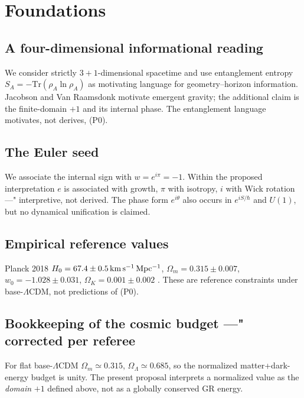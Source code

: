\documentclass[twocolumn]{aastex631}
\begin{document}
\section{Foundations}

\subsection{A four-dimensional informational reading}

We consider strictly $3+1$-dimensional spacetime and use entanglement entropy $S_{A}=-\mathrm{Tr}(\rho_{A}\ln\rho_{A})$ as motivating language for geometry--horizon information. Jacobson and Van Raamsdonk \cite{Jacobson2016,VanRaamsdonk2010} motivate emergent gravity; the additional claim is the finite-domain $+1$ and its internal phase. The entanglement language motivates, not derives, (P0).

\subsection{The Euler seed}

We associate the internal sign with $w=e^{i\pi}=-1$. Within the proposed interpretation $e$ is associated with growth, $\pi$ with isotropy, $i$ with Wick rotation ---" interpretive, not derived. The phase form $e^{i\theta}$ also occurs in $e^{iS/\hbar}$ and $U(1)$, but no dynamical unification is claimed.

\subsection{Empirical reference values}

Planck 2018 $H_{0}=67.4\pm0.5\,{\rm km\,s^{-1}\,Mpc^{-1}}$, $\Omega_{m}=0.315\pm0.007$, $w_{0}=-1.028\pm0.031$, $\Omega_{K}=0.001\pm0.002$ \cite{Planck2020}. These are reference constraints under base-$\Lambda$CDM, not predictions of (P0).

\subsection{Bookkeeping of the cosmic budget ---" corrected per referee}

For flat base-$\Lambda$CDM $\Omega_{m}\simeq0.315$, $\Omega_{\Lambda}\simeq0.685$, so the normalized matter+dark-energy budget is unity. The present proposal interprets a normalized value as the \emph{domain} $+1$ defined above, not as a globally conserved GR energy.
\end{document}
